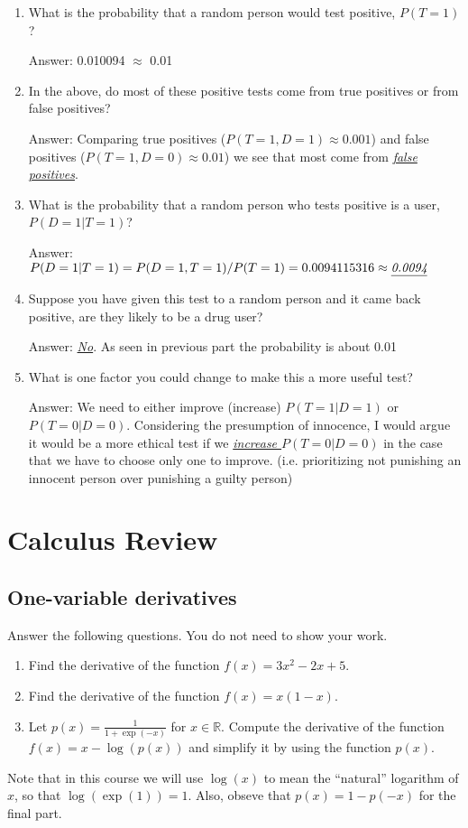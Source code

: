 \documentclass{article}
\def\ans#1{\par\gre{Answer: #1}}
\def\blu#1{{\color{blu}#1}}
\def\gre#1{{\color{gre}#1}}
\def\R{\mathbb{R}}
\begin{document}
\begin{enumerate}
\item What is the probability that a random person would test positive, $P(T=1)$?
\ans{0.010094 $\approx$ 0.01}
\item In the above, do most of these positive tests come from true positives or from false positives?
\ans{Comparing true positives ($P(T=1,D=1)\approx0.001$) and false positives ($P(T=1, D=0)\approx0.01$) we see that most come from \emph{\underline{false positives}}.}
\item What is the probability that a random person who tests positive is a user, $P(D=1|T=1)$?
\ans{$P(D=1|T=1) = P(D=1,T=1)/P(T=1) = 0.0094115316 \approx \emph{\underline{0.0094}}$}
\item Suppose you have given this test to a random person and it came back positive, are they likely to be a drug user?
\ans{\emph{\underline{No}}. As seen in previous part the probability is about 0.01}
\item What is one factor you could change to make this a more useful test?
\ans{We need to either improve (increase) $P(T=1|D=1)$ or $P(T=0|D=0)$. Considering the presumption of innocence, I would argue it would be a more ethical test if we \emph{\underline{increase $P(T=0|D=0)$}} in the case that we have to choose only one to improve. (i.e. prioritizing not punishing an innocent person over punishing a guilty person)}
\end{enumerate}


\section{Calculus Review}


\subsection{One-variable derivatives}

\blu{Answer the following questions.} You do not need to show your work.

\begin{enumerate}
\item Find the derivative of the function $f(x) = 3x^2 -2x + 5$.
\item Find the derivative of the function $f(x) = x(1-x)$.
\item Let $p(x) = \frac{1}{1+\exp(-x)}$ for $x \in \R$. Compute the derivative of the function $f(x) = x-\log(p(x))$ and simplify it by using the function $p(x)$.
\end{enumerate}
Note that in this course we will use $\log(x)$ to mean the ``natural'' logarithm of $x$, so that $\log(\exp(1)) = 1$. Also, obseve that $p(x) = 1-p(-x)$ for the final part.
\end{document}
